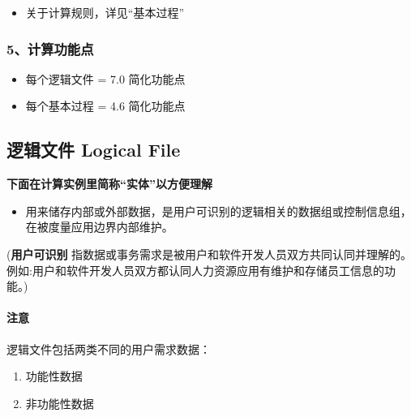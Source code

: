 \begin{itemize}
\tightlist
\item
  关于计算规则，详见``基本过程''
\end{itemize}

\hypertarget{ux8ba1ux7b97ux529fux80fdux70b9}{%
\subsubsection{5、计算功能点}\label{ux8ba1ux7b97ux529fux80fdux70b9}}

\begin{itemize}
\tightlist
\item
  每个逻辑文件 = 7.0 简化功能点
\item
  每个基本过程 = 4.6 简化功能点
\end{itemize}

\hypertarget{ux903bux8f91ux6587ux4ef6-logical-file}{%
\subsection{逻辑文件 Logical
File}\label{ux903bux8f91ux6587ux4ef6-logical-file}}

\textbf{下面在计算实例里简称``实体''以方便理解}

\begin{itemize}
\tightlist
\item
  用来储存内部或外部数据，是用户可识别的逻辑相关的数据组或控制信息组，在被度量应用边界内部维护。
\end{itemize}

\begin{description}
\tightlist
\item[]
(\textbf{用户可识别}
指数据或事务需求是被用户和软件开发人员双方共同认同并理解的。
例如:用户和软件开发人员双方都认同人力资源应用有维护和存储员工信息的功能。)
\end{description}

\hypertarget{ux6ce8ux610f}{%
\paragraph{注意}\label{ux6ce8ux610f}}

逻辑文件包括两类不同的用户需求数据：

\begin{enumerate}
\tightlist
\item
  功能性数据
\item
  非功能性数据
\end{enumerate}

